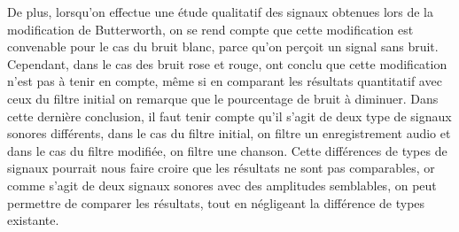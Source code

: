 \documentclass[conference,onecolumn]{IEEEtran}
\begin{document}
De plus, lorsqu'on effectue une étude qualitatif des signaux obtenues lors de la modification de Butterworth, on se rend compte que cette modification est convenable pour le cas du bruit blanc, parce qu'on perçoit un signal sans bruit. Cependant, dans le cas des bruit rose et rouge, ont conclu que cette modification n'est pas à tenir en compte, même si en comparant les résultats quantitatif avec ceux du filtre initial on remarque que le pourcentage de bruit à diminuer. Dans cette dernière conclusion, il faut tenir compte qu'il s'agit de deux type de signaux sonores différents, dans le cas du filtre initial, on filtre un enregistrement audio et dans le cas du filtre modifiée, on filtre une chanson. Cette différences de types de signaux pourrait nous faire croire que les résultats ne sont pas comparables, or comme s'agit de deux signaux sonores avec des amplitudes semblables, on peut permettre de comparer les résultats, tout en négligeant la différence de types existante.

\newpage
\end{document}
